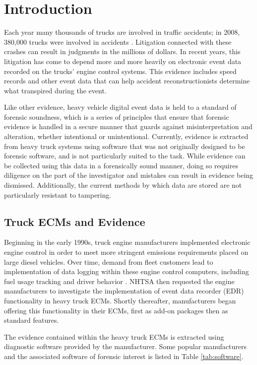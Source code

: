 \chapter{Introduction}
Each year many thousands of trucks are involved in traffic accidents; in 2008, 380,000 trucks were involved in accidents \cite{NHTSA2008}.
Litigation connected with these crashes can result in judgments in the millions of dollars. In recent years, this litigation has 
come to depend more and more heavily on electronic event data recorded on the trucks' engine control systems. 
This evidence includes speed records and other event data that can help accident reconstructionists 
determine what transpired during the event.

Like other evidence, heavy vehicle digital event data is held to a standard of forensic soundness, which is a series of principles 
that ensure that forensic evidence is handled in a secure manner that guards against misinterpretation and alteration, whether intentional
or unintentional.
Currently, evidence is extracted from heavy truck systems using software that was not originally designed to be 
forensic software, and is not particularly suited to the task. While evidence can be collected using this data in a forensically sound 
manner, doing so requires diligence on the part of the investigator and mistakes can result in evidence being dismissed. Additionally, 
the current methods by which data are stored are not particularly resistant to tampering. 

\section{Truck ECMs and Evidence}

Beginning in the early 1990s, truck engine manufacturers implemented electronic engine control in order to meet more stringent emissions
requirements placed on large diesel vehicles. Over time, demand from fleet customers lead to implementation of data logging within these
engine control computers, including fuel usage tracking and driver behavior . NHTSA then requested the engine manufacturers to investigate the implementation
of event data recorder (EDR) functionality in heavy truck ECMs. Shortly thereafter, manufacturers began offering this functionality in their
ECMs, first as add-on packages then as standard features.

The evidence contained within the heavy truck ECMs is extracted using diagnostic software provided by the manufacturer. Some popular
manufacturers and the associated software of forensic interest is listed in Table \ref{tab:software}.

